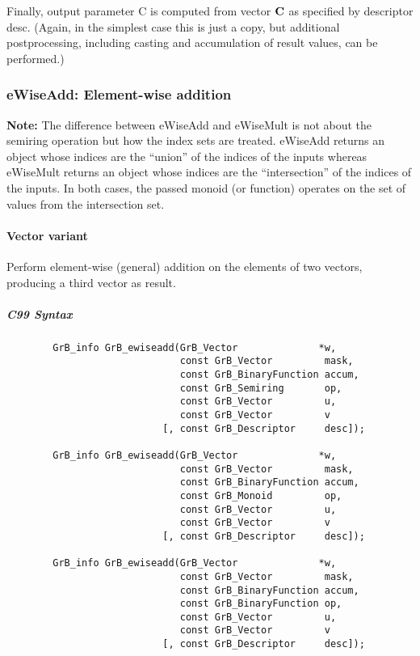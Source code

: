 Finally, output parameter {\sf C} is computed from vector ${\bf C}$
as specified by descriptor {\sf desc}. (Again, in the simplest case this
is just a copy, but additional postprocessing, including casting and
accumulation of result values, can be performed.) 



\subsubsection{{\sf eWiseAdd}: Element-wise addition}

{\bf Note:} The difference between {\sf eWiseAdd} and {\sf eWiseMult} is not about the semiring operation but how the index sets are treated.
 {\sf eWiseAdd} returns an object whose indices are the ``union'' of the indices of the inputs whereas  
 {\sf eWiseMult} returns an object whose indices are the ``intersection'' of the indices of the inputs. In both cases, the passed monoid (or function) operates on the 
 set of values from the intersection set. 

\paragraph{Vector variant}

Perform element-wise (general) addition on the elements of two vectors,
producing a third vector as result.

\subparagraph{C99 Syntax}

\begin{verbatim}
        GrB_info GrB_ewiseadd(GrB_Vector              *w,
                              const GrB_Vector         mask,
                              const GrB_BinaryFunction accum,
                              const GrB_Semiring       op, 
                              const GrB_Vector         u,
                              const GrB_Vector         v
                           [, const GrB_Descriptor     desc]);
                            
        GrB_info GrB_ewiseadd(GrB_Vector              *w,
                              const GrB_Vector         mask,
                              const GrB_BinaryFunction accum,
                              const GrB_Monoid         op, 
                              const GrB_Vector         u,
                              const GrB_Vector         v
                           [, const GrB_Descriptor     desc]);
                            
        GrB_info GrB_ewiseadd(GrB_Vector              *w,
                              const GrB_Vector         mask,
                              const GrB_BinaryFunction accum,
                              const GrB_BinaryFunction op, 
                              const GrB_Vector         u,
                              const GrB_Vector         v
                           [, const GrB_Descriptor     desc]);
\end{verbatim}

